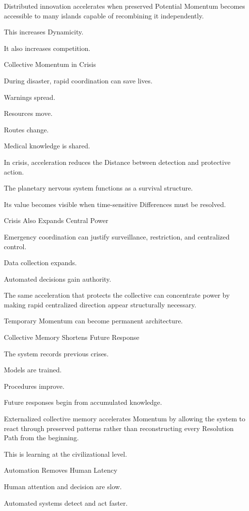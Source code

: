 Distributed innovation accelerates when preserved Potential Momentum becomes accessible to many islands capable of recombining it independently.

This increases Dynamicity.

It also increases competition.

Collective Momentum in Crisis

During disaster, rapid coordination can save lives.

Warnings spread.

Resources move.

Routes change.

Medical knowledge is shared.

In crisis, acceleration reduces the Distance between detection and protective action.

The planetary nervous system functions as a survival structure.

Its value becomes visible when time-sensitive Differences must be resolved.

Crisis Also Expands Central Power

Emergency coordination can justify surveillance, restriction, and centralized control.

Data collection expands.

Automated decisions gain authority.

The same acceleration that protects the collective can concentrate power by making rapid centralized direction appear structurally necessary.

Temporary Momentum can become permanent architecture.

Collective Memory Shortens Future Response

The system records previous crises.

Models are trained.

Procedures improve.

Future responses begin from accumulated knowledge.

Externalized collective memory accelerates Momentum by allowing the system to react through preserved patterns rather than reconstructing every Resolution Path from the beginning.

This is learning at the civilizational level.

Automation Removes Human Latency

Human attention and decision are slow.

Automated systems detect and act faster.

